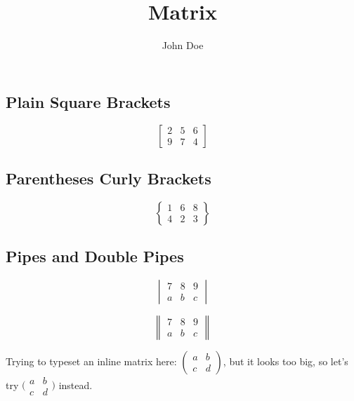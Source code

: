 \documentclass{article}
\title{Matrix}
\author{John Doe}
\begin{document}
	
	\maketitle
	
	\subsection*{Plain Square Brackets}
	
	\[
	\begin{bmatrix}
		2 & 5 & 6 \\
		9 & 7 & 4
	\end{bmatrix}
	\]
	\subsection*{Parentheses Curly Brackets}
	\[
	\begin{Bmatrix}
		1 & 6 & 8\\
		4 & 2 & 3
	\end{Bmatrix}
	\]
	\subsection*{Pipes and Double Pipes}
	\[
	\begin{vmatrix}
		7 & 8 & 9\\
		a & b & c
	\end{vmatrix}
	\]
	
		\[
	\begin{Vmatrix}
		7 & 8 & 9\\
		a & b & c
	\end{Vmatrix}
	\]
	
	\noindent Trying to typeset an inline matrix here:
	$\begin{pmatrix}
		a & b\\ 
		c & d
	\end{pmatrix}$,  
	but it looks too big, so let's try 
	$\big(\begin{smallmatrix}
		a & b\\
		c & d
	\end{smallmatrix}\big)$ 
	instead.
	
\end{document}
